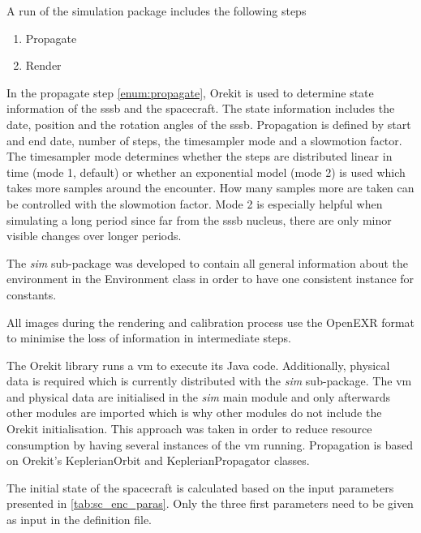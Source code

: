 A run of the simulation package includes the following steps
\begin{enumerate}
    \item Propagate \label{enum:propagate}
    \item Render
\end{enumerate}

In the propagate step \ref{enum:propagate}, Orekit is used to determine state information of the \gls{sssb} and the spacecraft. The state information includes the date, position and the rotation angles of the \gls{sssb}. Propagation is defined by start and end date, number of steps, the timesampler mode and a slowmotion factor.
The timesampler mode determines whether the steps are distributed linear in time (mode 1, default) or whether an exponential model (mode 2) is used which takes more samples around the encounter. How many samples more are taken can be controlled with the slowmotion factor. Mode 2 is especially helpful when simulating a long period since far from the \gls{sssb} nucleus, there are only minor visible changes over longer periods.

The \textit{sim} sub-package was developed to contain all general information about the environment in the Environment class in order to have one consistent instance for constants. 

All images during the rendering and calibration process use the OpenEXR format to minimise the loss of information in intermediate steps.

The Orekit library runs a \gls{vm} to execute its Java code. Additionally, physical data is required which is currently distributed with the \textit{sim} sub-package. The \gls{vm} and physical data are initialised in the \textit{sim} main module and only afterwards other modules are imported which is why other modules do not include the Orekit initialisation. This approach was taken in order to reduce resource consumption by having several instances of the \gls{vm} running. Propagation is based on Orekit's KeplerianOrbit and KeplerianPropagator classes.

The initial state of the spacecraft is calculated based on the input parameters presented in \ref{tab:sc_enc_paras}. Only the three first parameters need to be given as input in the definition file.

